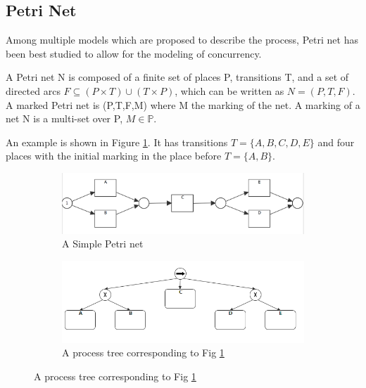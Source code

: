 \subsection{Petri Net}
Among multiple models which are proposed to describe the process, Petri net has been best studied to allow for the modeling of concurrency. 
\begin{definition}
	A Petri net N is composed of a finite set of places P, transitions T, and a set of directed arcs $F \subseteq (P \times T) \cup (T \times P)$, which can be written as $N=(P,T,F)$. A marked Petri net is (P,T,F,M) where M the marking of the net. A marking of a net N is a multi-set over P, $M \in \mathbb{P} $. 
\end{definition}
An example is shown in Figure \ref{fig:pn-seq-2}. It has transitions $T=\{A,B,C,D,E\}$ and four places with the initial marking in the place before $T=\{A,B\}$. 
\begin{figure}[!h]
	\centering
	\begin{subfigure}[b]{0.45\textwidth}
		\centering
		\includegraphics[width=\linewidth]{figures/preliminary/PN06_Seq_2_xor_notnested.png}
		\caption{A Simple Petri net}
		\label{fig:pn-seq-2}
	\end{subfigure}%
	\quad
	\begin{subfigure}[b]{0.45\textwidth}
		\centering
		\includegraphics[width=\linewidth]{figures/preliminary/PT06_Seq_2_xor_notnested.png}
		\caption{A process tree corresponding to Fig \ref{fig:pn-seq-2}}
		\label{fig:pt-seq-2}
	\end{subfigure}%
\end{figure}

